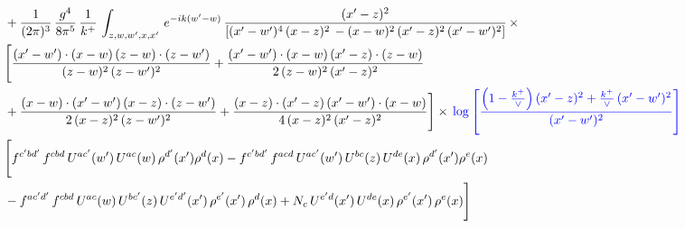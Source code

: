 \documentclass[10pt]{article}
\numberwithin{equation}{section}
\newcommand{\new}[1]{{\color{blue}#1}}
\begin{document}
\begin{align}
&  + \frac{1}{(2\pi)^{3}}\, \frac{g^{4}}{8\pi^{5}}\,\frac{1}{k^{+}}\,\int_{z,w,w^{\prime},x,x'}\, e^{-ik(w^{\prime}-w)}\, \frac{(x'-z)^{2}}{\left[(x'-w')^{4}\,(x-z)^{2}\, - (x-w)^{2}\, (x'-z)^{2}\,(x'-w')^{2}\right]}\,  \times\notag \\ & \Bigg[\frac{(x'-w')\cdot (x-w)\, (z-w)\cdot (z-w')}{(z-w)^{2}\, (z-w')^{2}}+\frac{(x'-w')\cdot (x-w)\, (x'-z)\cdot (z-w)}{2\, (z-w)^{2}\, (x'-z)^{2}}\notag \\ & +\frac{(x-w)\cdot (x'-w')\, (x-z)\cdot (z-w')}{2\, (x-z)^{2}\, (z-w')^{2}}+\frac{(x-z)\cdot (x'-z)\, (x'-w')\cdot (x-w)}{4\, (x-z)^{2}\, (x'-z)^{2}}\Bigg] \times\,\new{\log{\left[\frac{\left(1-\frac{k^{+}}{\vee}\right)(x'-z)^{2}+\frac{k^{+}}{\vee}\,(x'-w')^{2}}{(x'-w')^{2}}\right]}} \notag \\ & \Bigg[f^{c'bd'}\,f^{cbd}\, U^{ac'}(w')\,U^{ac}(w)\,\rho^{d'}(x')\rho^{d}(x)- f^{c'bd'}\,f^{acd}\,U^{ac'}(w')\,U^{bc}(z)\,U^{de}(x)\,\rho^{d'}(x')\rho^{e}(x) \notag \\ & -f^{ac'd'}\,f^{cbd}\,U^{ac}(w)\,U^{bc'}(z)\,U^{e'd'}(x')\,\rho^{e'}(x')\,\rho^{d}(x) +N_{c}\,U^{e'd}(x')\,U^{de}(x)\,\rho^{e'}(x')\,\rho^{e}(x)\Bigg] \label{eq:F:G2I2b}
\end{align}
\end{document}
